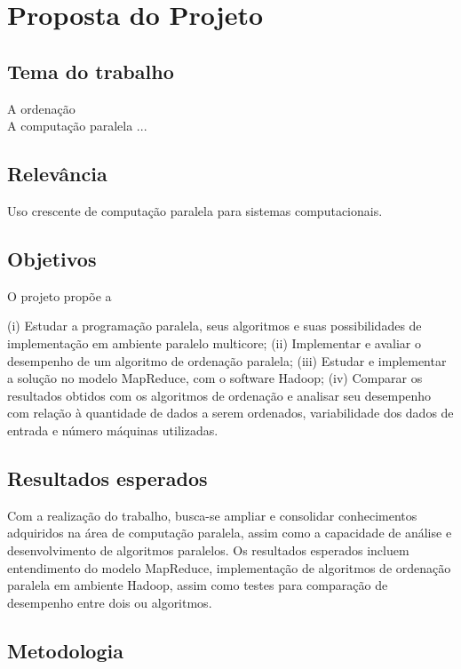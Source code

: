 \chapter{Proposta do Projeto}

\section{Tema do trabalho}

A ordenação  \\

A computação paralela ...


\section{Relevância}

Uso crescente de computação paralela para sistemas computacionais.

\section{Objetivos}

O projeto propõe a 

(i) Estudar a programação paralela, seus algoritmos e suas possibilidades de implementação em ambiente paralelo multicore;
(ii) Implementar e avaliar o desempenho de um algoritmo de ordenação paralela;
(iii) Estudar e implementar a solução no modelo MapReduce, com o software Hadoop;
(iv) Comparar os resultados obtidos com os algoritmos de ordenação e analisar seu desempenho com relação à quantidade de dados a serem ordenados, variabilidade dos dados de entrada e número máquinas utilizadas.

\section{Resultados esperados}

Com a realização do trabalho, busca-se ampliar e consolidar conhecimentos adquiridos na área de computação paralela, assim como
a capacidade de análise e desenvolvimento de algoritmos paralelos. 
Os resultados esperados incluem entendimento do modelo MapReduce, implementação de algoritmos de ordenação paralela em ambiente Hadoop, assim como testes para comparação de desempenho entre dois ou algoritmos. 

\section{Metodologia}

